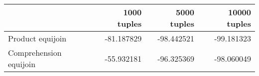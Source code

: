 \begin{tabular}{lrrr}
\toprule
 & 1000 tuples & 5000 tuples & 10000 tuples \\
\midrule
Product equijoin & -81.187829 & -98.442521 & -99.181323 \\
Comprehension equijoin & -55.932181 & -96.325369 & -98.060049 \\
\bottomrule
\end{tabular}
